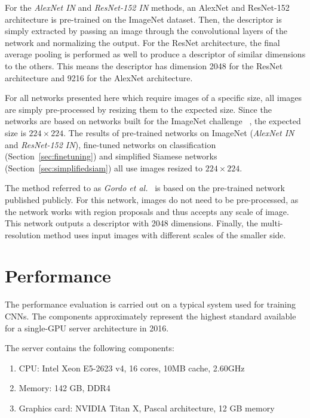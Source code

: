 For the \emph{AlexNet IN} and \emph{ResNet-152 IN} methods,
an AlexNet and ResNet-152 architecture is pre-trained on the ImageNet dataset.
Then, the descriptor is simply extracted by passing an image through the
convolutional layers of the
network and normalizing the output. For the ResNet architecture, the final
average pooling is performed as well to produce a descriptor of similar
dimensions to the others. This means the descriptor has dimension 2048
for the ResNet architecture and 9216 for the AlexNet architecture.

For all networks presented here which require images of a specific size,
all images are simply pre-processed by resizing them to the expected
size. Since the networks are based on networks built for the ImageNet
challenge
~\cite{russakovsky_imagenet_2015,he_deep_2015,krizhevsky_imagenet_2012},
the expected size is $224 \times 224$. The results of pre-trained
networks on ImageNet (\emph{AlexNet IN} and \emph{ResNet-152 IN}),
fine-tuned networks on classification (Section~\ref{sec:finetuning}) and
simplified Siamese networks (Section~\ref{sec:simplifiedsiam}) all use
images resized to $224 \times 224$.

The method referred to as \emph{Gordo et al.}~\cite{gordo_deep_2016}
is based on the pre-trained network published publicly.
For this network, images do not need to
be pre-processed, as the network works with region proposals and thus accepts
any scale of image. This network outputs a descriptor with 2048 dimensions.
Finally, the multi-resolution method uses input images with different
scales of the smaller side.

\section{Performance}
The performance evaluation is carried out on a typical system used for training CNNs.
The components approximately represent the highest standard available for a
single-GPU server architecture in 2016.

The server contains the following components:
\begin{enumerate}
    \item CPU: Intel\textsuperscript{\textregistered} Xeon\textsuperscript{\textregistered}
    E5-2623 v4, 16 cores, 10MB cache, 2.60GHz
    \item Memory: 142 GB, DDR4 %
    \item Graphics card: NVIDIA\textsuperscript{\textregistered} Titan X, Pascal architecture,
    12 GB memory
\end{enumerate}


